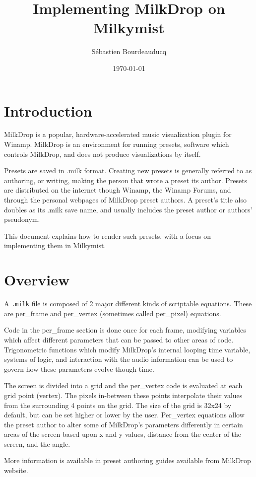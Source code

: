 \documentclass[a4paper,11pt]{article}
\title{Implementing MilkDrop on Milkymist}
\author{S\'ebastien Bourdeauducq}
\date{\today}
\begin{document}
\setlength{\parindent}{0pt}
\setlength{\parskip}{5pt}
\maketitle{}
\section{Introduction}
MilkDrop is a popular, hardware-accelerated music visualization plugin for Winamp. MilkDrop is an environment for running presets, software which controls MilkDrop, and does not produce visualizations by itself.

Presets are saved in .milk format. Creating new presets is generally referred to as authoring, or writing, making the person that wrote a preset its author. Presets are distributed on the internet though Winamp, the Winamp Forums, and through the personal webpages of MilkDrop preset authors. A preset's title also doubles as its .milk save name, and usually includes the preset author or authors' pseudonym.

This document explains how to render such presets, with a focus on implementing them in Milkymist.

\section{Overview}
A \verb!.milk! file is composed of 2 major different kinds of scriptable equations. These are per\_frame and per\_vertex (sometimes called per\_pixel) equations.

Code in the per\_frame section is done once for each frame, modifying variables which affect different parameters that can be passed to other areas of code. Trigonometric functions which modify MilkDrop's internal looping time variable, systems of logic, and interaction with the audio information can be used to govern how these parameters evolve though time.

The screen is divided into a grid and the per\_vertex code is evaluated at each grid point (vertex). The pixels in-between these points interpolate their values from the surrounding 4 points on the grid. The size of the grid is 32x24 by default, but can be set higher or lower by the user. Per\_vertex equations allow the preset author to alter some of MilkDrop's parameters differently in certain areas of the screen based upon x and y values, distance from the center of the screen, and the angle.

More information is available in preset authoring guides available from MilkDrop website.
\end{document}
